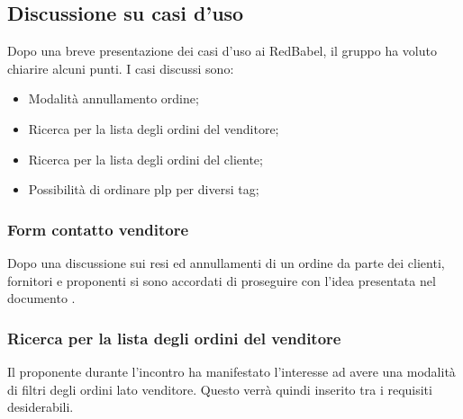 \subsection{Discussione su casi d'uso}
Dopo una breve presentazione dei casi d'uso ai RedBabel, il gruppo ha voluto chiarire alcuni punti.
I casi discussi sono:
\begin{itemize}
	\item Modalità annullamento ordine;
	\item Ricerca per la lista degli ordini del venditore;
	\item Ricerca per la lista degli ordini del cliente;
	\item Possibilità di ordinare plp per diversi tag;
\end{itemize}


\subsubsection{Form contatto venditore}
Dopo una discussione sui resi ed annullamenti di un ordine da parte dei clienti, fornitori e proponenti si sono accordati di proseguire con l'idea presentata nel documento \textit{}.

\subsubsection{Ricerca per la lista degli ordini del venditore}
Il proponente durante l'incontro ha manifestato l'interesse ad avere una modalità di filtri degli ordini lato venditore. Questo verrà quindi inserito tra i requisiti desiderabili.

